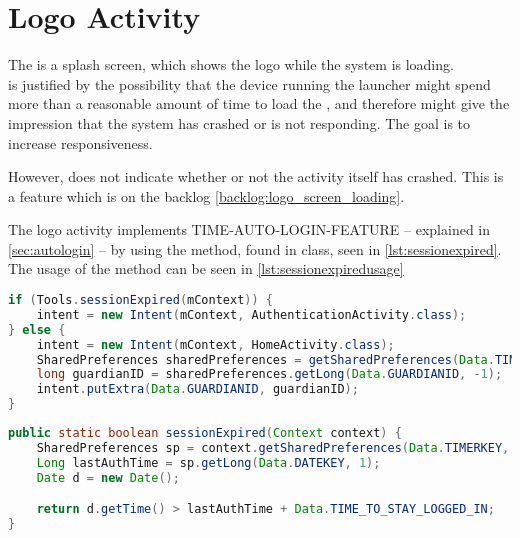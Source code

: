 \section{Logo Activity}
The  is a splash screen, which shows the \giraf[] logo while the system is loading. \\
 is justified by the possibility that the device running the launcher might spend more than a reasonable amount of time to load the , and therefore might give the impression that the system has crashed or is not responding. The goal is to increase responsiveness.

However,  does not indicate whether or not the activity itself has crashed. This is a feature which is on the backlog \autoref{backlog:logo_screen_loading}.

The logo activity implements TIME-AUTO-LOGIN-FEATURE -- explained in \autoref{sec:autologin} -- by using the  method, found in  class, seen in \autoref{lst:sessionexpired}.
The usage of the  method can be seen in \autoref{lst:sessionexpiredusage}

\begin{lstlisting}[style=sourceCode, language=JAVA, caption=Snippet of: LogoActivity.java, label=lst:sessionexpiredusage] 
if (Tools.sessionExpired(mContext)) {
	intent = new Intent(mContext, AuthenticationActivity.class);
} else {
	intent = new Intent(mContext, HomeActivity.class);
	SharedPreferences sharedPreferences = getSharedPreferences(Data.TIMERKEY, 0);
	long guardianID = sharedPreferences.getLong(Data.GUARDIANID, -1);
	intent.putExtra(Data.GUARDIANID, guardianID);
}
\end{lstlisting}


\begin{lstlisting}[style=sourceCode, language=JAVA, caption=Snippet of: Tools.java, label=lst:sessionexpired]
public static boolean sessionExpired(Context context) {
	SharedPreferences sp = context.getSharedPreferences(Data.TIMERKEY, 0);
	Long lastAuthTime = sp.getLong(Data.DATEKEY, 1);
	Date d = new Date();

	return d.getTime() > lastAuthTime + Data.TIME_TO_STAY_LOGGED_IN;
}
	\end{lstlisting}